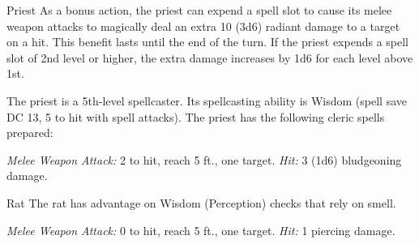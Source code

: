 \documentclass[10pt,a4paper,twoside,bg=print,twocolumn,openany,nodeprecatedcode]{dndbook}
\begin{document}
\begin{DndMonster}[float=t]{Priest}
\DndMonsterBasics[
armor-class = {13 (\textit{chain shirt})},
hit-points = {\DndDice{5d8 + 5}},
speed = {30 ft.}
]
\DndMonsterAbilityScores[
 str = 10,
 dex = 10,
 con = 12,
 int = 13,
 wis = 16,
 cha = 13
]
\DndMonsterDetails[
skills = {Medicine +7, Persuasion +3, Religion +5},
languages = {any two languages},
challenge = 2,
]
As a bonus action, the priest can expend a spell slot to cause its melee weapon attacks to magically deal an extra 10 (3d6) radiant damage to a target on a hit. This benefit lasts until the end of the turn. If the priest expends a spell slot of 2nd level or higher, the extra damage increases by 1d6 for each level above 1st.

The priest is a 5th-level spellcaster. Its spellcasting ability is Wisdom (spell save DC 13, 5 to hit with spell attacks). The priest has the following cleric spells prepared:
\begin{DndMonsterSpells}
\end{DndMonsterSpells}
\textsl{Melee Weapon Attack:} 2 to hit, reach 5 ft., one target. \textsl{Hit:} 3 (1d6) bludgeoning damage.

\end{DndMonster}



\begin{DndMonster}[float=t]{Rat}
\DndMonsterBasics[
armor-class = {10},
hit-points = {\DndDice{1d4 - 1}},
speed = {20 ft.}
]
\DndMonsterAbilityScores[
 str = 2,
 dex = 11,
 con = 9,
 int = 2,
 wis = 10,
 cha = 4
]
\DndMonsterDetails[
senses = {darkvision 30 ft., passive perception 10},
challenge = 0,
]
The rat has advantage on Wisdom (Perception) checks that rely on smell.

\textsl{Melee Weapon Attack:} 0 to hit, reach 5 ft., one target. \textsl{Hit:} 1 piercing damage.

\end{DndMonster}
\end{document}
